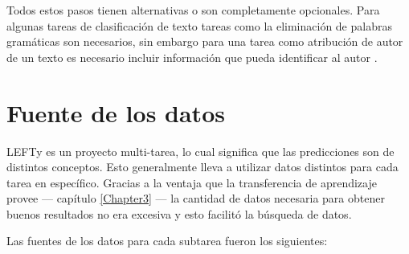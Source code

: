 Todos estos pasos tienen alternativas o son completamente opcionales. Para algunas tareas de clasificación de texto tareas como la eliminación de palabras gramáticas son necesarios, sin embargo para una tarea como atribución de autor de un texto es necesario incluir información que pueda identificar al autor \parencite{coulthard2004author, louwerse2004semantic}.

\section{Fuente de los datos}

LEFTy es un proyecto multi-tarea, lo cual significa que las predicciones son de distintos conceptos. Esto generalmente lleva a utilizar datos distintos para cada tarea en específico. Gracias a la ventaja que la transferencia de aprendizaje provee --- capítulo \ref{Chapter3} --- la cantidad de datos necesaria para obtener buenos resultados no era excesiva y esto facilitó la búsqueda de datos.

Las fuentes de los datos para cada subtarea fueron los siguientes:

